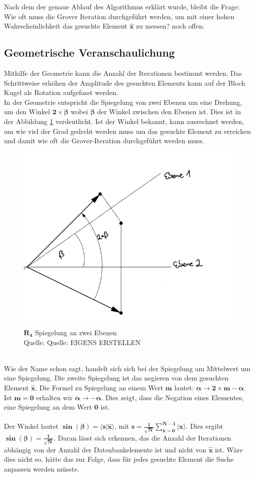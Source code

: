 Nach dem der genaue Ablauf des Algorithmus erklärt wurde, bleibt die Frage: Wie oft muss die Grover Iteration durchgeführt werden, um mit einer hohen Wahrscheinlichkeit das gesuchte Element $\mathbf{\hat{x}}$ zu messen? noch offen.

\subsection{Geometrische Veranschaulichung}
Mithilfe der Geometrie kann die Anzahl der Iterationen bestimmt werden. Das Schrittweise erhöhen der Amplitude des gesuchten Elements kann auf der Bloch Kugel als Rotation aufgefasst werden. 
\\
In der Geometrie entspricht die Spiegelung von zwei Ebenen um eine Drehung, um den Winkel $\mathbf{2 \times \beta}$ wobei $\mathbf{\beta}$ der Winkel zwischen den Ebenen ist. Dies ist in der Abbildung \ref{fig:zweiEbenen} verdeutlicht. Ist der Winkel bekannt, kann ausrechnet werden, um wie viel der Grad gedreht werden muss um das gesuchte Element zu erreichen und damit wie oft die Grover-Iteration durchgeführt werden muss.
 \begin{figure}[hbtp]
	\centering
	\includegraphics[width=.6\textwidth]{figures/zweiEbenen.png}
	\caption{$\mathbf{R_4}$ Spiegelung an zwei Ebenen \\ Quelle: Quelle: EIGENS ERSTELLEN}
	\label{fig:zweiEbenen}
\end{figure} 
\noindent
\\
Wie der Name schon sagt, handelt sich sich bei der Spiegelung am Mittelwert um eine Spiegelung. Die zweite Spiegelung ist das negieren von dem gesuchten Element $\mathbf{\hat{x}}$. Die Formel zu Spiegelung an einem Wert $\mathbf{m}$ lautet: $\mathbf{\alpha \rightarrow 2 \times m - \alpha}$. Ist $\mathbf{m=0}$ erhalten wir $\mathbf{\alpha \rightarrow - \alpha}$. Dies zeigt, dass die Negation eines Elementes, eine Spiegelung an dem Wert $\mathbf{0}$ ist.
\\ 
\\
Der Winkel lautet $\mathbf{\sin(\beta) = \langle s | \hat{x} \rangle}$, mit $\mathbf{s = \frac{1}{\sqrt{N}}\sum\limits_{x=0}^{N-1}|x\rangle}$. Dies ergibt  $\mathbf{\sin(\beta) = \frac{1}{\sqrt N}}$. Daran lässt sich erkennen, das die Anzahl der Iterationen abhängig von der Anzahl der Datenbankelemente ist und nicht von $\mathbf{\hat{x}}$ ist. Wäre dies nicht so, hätte das zur Folge, dass für jedes gesuchte Element die Suche anpassen werden müsste.
